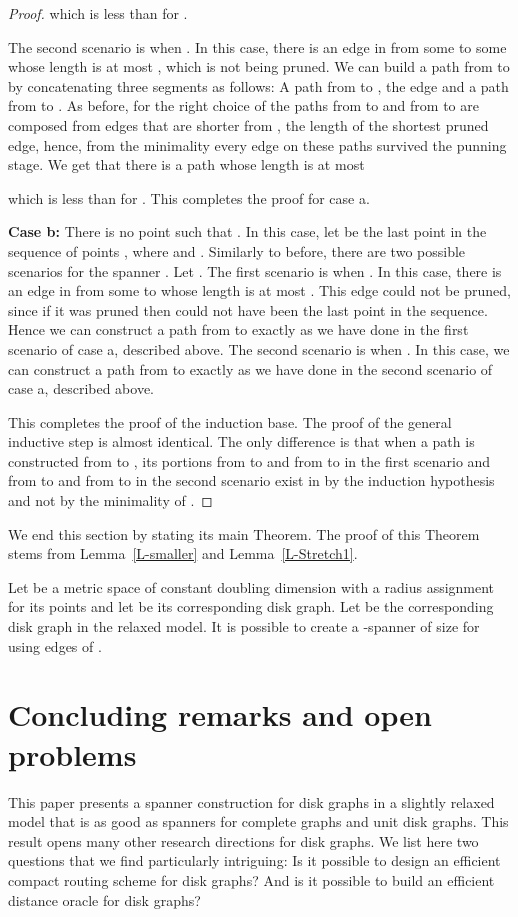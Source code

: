\documentclass[proceedings]{stacs}
\theoremstyle{plain}\newtheorem{satz}[thm]{Satz}
\theoremstyle{definition}\newtheorem{crucial}[thm]{Crucial Definition}
\begin{document}
\begin{proof}
which is less than  for .

The second scenario is when . In this
case, there is an edge in  from some  to some 
whose length is at most , which is
not being pruned. We can build a path from  to  by
concatenating three segments as follows: A path from  to ,
the edge  and a path from  to . As before, for the
right choice of  the paths from  to  and from  to
 are composed from edges that are shorter from ,
the length of the shortest pruned edge, hence, from the minimality
 every edge on these paths survived the punning
stage. We get that there is a path whose length is at most

which is less than  for . This
completes the proof for case a.

{\bf Case b:} There is no point  such that .
In this case, let  be the last point in the sequence of
points , where  and . Similarly to before, there are two possible scenarios for
the spanner . Let . The first scenario is
when . In this case, there is an edge in
 from some  to  whose
length is at most . This edge could
not be pruned, since if it was pruned then  could not
have been the last point in the sequence. Hence we can construct a
path from  to  exactly as we have done in the first scenario
of case a, described above. The second scenario is when
. In this case, we can construct a path
from  to  exactly as we have done in the second scenario of
case a, described above.

This completes the proof of the induction base. The proof of the
general inductive step is almost identical. The only difference is
that when a path is constructed from  to , its portions from
 to  and from  to  in the first scenario and
from  to  and from  to  in the second scenario exist
in  by the induction hypothesis and not by the minimality
of .
\end{proof}

We end this section by stating its main Theorem. The proof of this
Theorem stems from Lemma~\ref{L-smaller} and
Lemma~\ref{L-Stretch1}.

\begin{theorem}
Let  be a metric space of constant doubling dimension
with a radius assignment  for its points and let
 be its corresponding disk graph. Let
 be the corresponding disk graph in the
relaxed model. It is possible to create a -spanner of
size  for  using edges of .
\end{theorem}

\section{Concluding remarks and open problems}
\label{s:con}


This paper presents a spanner construction for disk graphs in a
slightly relaxed model that is as good as spanners for complete
graphs and unit disk graphs. This result opens many other research
directions for disk graphs. We list here two questions that we
find particularly intriguing: Is it possible to design an
efficient compact routing scheme for disk graphs? And is it
possible to build an efficient distance oracle for disk graphs?



\end{document}
